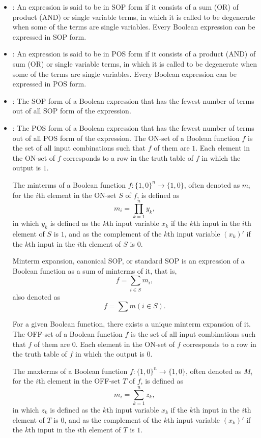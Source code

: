\documentclass[a4paper,12pt]{report}
\begin{document}
\begin{itemize}
\begin{itemize}
\begin{itemize}
\begin{itemize}
\begin{itemize}
\begin{itemize}
\begin{itemize}
\begin{itemize}
\bit
\item{}: An expression is said to be in SOP form if it consists of a sum (OR) of product (AND) or single variable terms, in which it is called to be degenerate when some of the terms are single variables. Every Boolean expression can be expressed in SOP form.
\item{}: An expression is said to be in POS form if it consists of a product (AND) of sum (OR) or single variable terms, in which it is called to be degenerate when some of the terms are single variables. Every Boolean expression can be expressed in POS form.
\item{}: The SOP form of a Boolean expression that has the fewest number of terms out of all SOP form of the expression.
\item{}: The POS form of a Boolean expression that has the fewest number of terms out of all POS form of the expression.
\eit
{}
The ON-set of a Boolean function $f$ is the set of all input combinations such that $f$ of them are $1$. Each element in the ON-set of $f$ corresponds to a row in the truth table of $f$ in which the output is $1$.

The minterms of a Boolean function $f\colon\{1,0\}^n\to\{1,0\}$, often denoted as $m_i$ for the $i$th element in the ON-set $S$ of $f$, is defined as
\[m_i=\prod_{k=1}^ny_k,\]
in which $y_k$ is defined as the $k$th input variable $x_k$ if the $k$th input in the $i$th element of $S$ is $1$, and as the complement of the $k$th input variable $(x_k)'$ if the $k$th input in the $i$th element of $S$ is $0$.

Minterm expansion, canonical SOP, or standard SOP is an expression of a Boolean function as a sum of minterms of it, that is,
\[f=\sum_{i\in S}m_i,\]
also denoted as 
\[f=\sum m(i\in S).\]

For a given Boolean function, there exists a unique minterm expansion of it.
The OFF-set of a Boolean function $f$ is the set of all input combinations such that $f$ of them are $0$. Each element in the ON-set of $f$ corresponds to a row in the truth table of $f$ in which the output is $0$.

The maxterms of a Boolean function $f\colon\{1,0\}^n\to\{1,0\}$, often denoted as $M_i$ for the $i$th element in the OFF-set $T$ of $f$, is defined as
\[m_i=\sum_{k=1}^nz_k,\]
in which $z_k$ is defined as the $k$th input variable $x_k$ if the $k$th input in the $i$th element of $T$ is $0$, and as the complement of the $k$th input variable $(x_k)'$ if the $k$th input in the $i$th element of $T$ is $1$.


\end{itemize}
\end{itemize}
\end{itemize}
\end{itemize}
\end{itemize}
\end{itemize}
\end{itemize}
\end{itemize}
\end{document}
